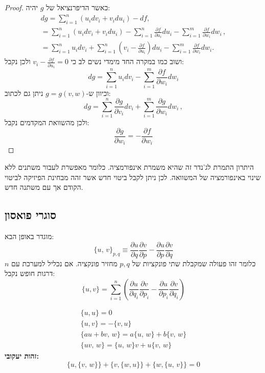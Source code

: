 \documentclass{tstextbook}
\begin{document}
\begin{proof}
כאשר הדיפרנציאל של \(g\) יהיה:
$$\begin{array}{l}{{d g=\displaystyle\sum_{i=1}^{n}\left(u_{i}d v_{i}+v_{i}d u_{i}\right)-d f,}}\\ {{=\displaystyle\sum_{i=1}^{n}\left(u_{i}d v_{i}+v_{i}d u_{i}\right)-\sum_{i=1}^{n}\frac{\partial f}{\partial u_{i}}d u_{i}-\sum_{i=1}^{m}\frac{\partial f}{\partial w_{i}}d w_{i}\,,}}\\ {{=\displaystyle\sum_{i=1}^{n}u_{i}d v_{i}+\sum_{i=1}^{n}\left(v_{i}-\frac{\partial f}{\partial u_{i}}\right)d u_{i}-\sum_{i=1}^{m}\frac{\partial f}{\partial w_{i}}d w_{i}.}}\end{array}$$
ושוב כמו במקרה החד מימדי נשים לב כי \(v_{i}-\frac{\partial f}{\partial u_{i}}=0\) ולכן נקבל:
$$d g=\sum_{i=1}^{n}u_{i}d v_{i}-\sum_{i=1}^{m}\frac{\partial f}{\partial w_{i}}d w_{i}$$
וכיוון ש-\(g=g(v,w)\) ניתן גם לכתוב:
$$d g=\sum_{i=1}^{n}\frac{\partial g}{\partial v_{i}}d v_{i}+\sum_{i=1}^{m}\frac{\partial g}{\partial w_{i}}d w_{i}\,,$$
ולכן מהשוואת המקדמים נקבל:
$${\frac{\partial g}{\partial w_{i}}}=-{\frac{\partial f}{\partial w_{i}}}$$

\end{proof}
\begin{remark}
היתרון התמרת לג'נדר זה שהיא משמרת אינפורמציה. כלומר מאפשרת לעבור משתנים ללא שינוי באינפורמציה של המשוואה. לכן ניתן לקבל ביטוי חדש אשר זהה מבחינת הפיזיקה לביטוי הקודם אך עם משתנה חדש.

\end{remark}
\subsection{סוגרי פואסון}

\begin{definition}
מוגדר באופן הבא:
$$\{u,\,v\}_{p,q}\equiv{\frac{\partial u}{\partial q}}{\frac{\partial v}{\partial p}}-{\frac{\partial u}{\partial p}}{\frac{\partial v}{\partial q}}$$
כלומר זהו פעולה שמקבלת שתי פונקציות של \(p,q\) מחזיר פונקציה. אם נכליל למערכת עם \(n\) דרגות חופש נקבל:
$$\{u,v\}=\sum_{i=1}^{n}\left({\frac{\partial u}{\partial q_{i}}}{\frac{\partial v}{\partial p_{i}}}-{\frac{\partial u}{\partial p_{i}}}{\frac{\partial v}{\partial q_{i}}}\right)$$

\end{definition}
\begin{proposition}
$$\begin{array}{c}{{{\{u,u\}=0}}}\\ {{{\{u,v\}=-\{v,u\}}}}\\ {{{\{a u+b v,\,w\}=a\{u,\,w\}+b\{v,\,w\}}}}\\  {{{\{u v,\,w\}=\{u,\,w\}v+u\{v,\,w\}}}}\end{array}$$\textbf{זהות יעקובי:}$$\{u,\{v,\,w\}\}+\{v,\{w,u\}\}+\{w,\{u,\,v\}\}=0$$

\end{proposition}
\end{document}
